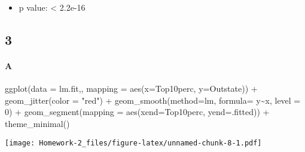\documentclass[
]{article}
\newenvironment{Shaded}{\begin{snugshade}}{\end{snugshade}}
\newcommand{\AttributeTok}[1]{\textcolor[rgb]{0.77,0.63,0.00}{#1}}
\newcommand{\DecValTok}[1]{\textcolor[rgb]{0.00,0.00,0.81}{#1}}
\newcommand{\FunctionTok}[1]{\textcolor[rgb]{0.00,0.00,0.00}{#1}}
\newcommand{\NormalTok}[1]{#1}
\newcommand{\SpecialCharTok}[1]{\textcolor[rgb]{0.00,0.00,0.00}{#1}}
\newcommand{\StringTok}[1]{\textcolor[rgb]{0.31,0.60,0.02}{#1}}
\providecommand{\tightlist}{%
  \setlength{\itemsep}{0pt}\setlength{\parskip}{0pt}}
\begin{document}
\begin{itemize}
\tightlist
\item
  p value: \textless{} 2.2e-16
\end{itemize}

\hypertarget{section-2}{%
\subsection{3}\label{section-2}}

\hypertarget{a-2}{%
\paragraph{A}\label{a-2}}

\begin{Shaded}
\begin{Highlighting}[]
\FunctionTok{ggplot}\NormalTok{(}\AttributeTok{data =}\NormalTok{ lm.fit,, }\AttributeTok{mapping =} \FunctionTok{aes}\NormalTok{(}\AttributeTok{x=}\NormalTok{Top10perc, }\AttributeTok{y=}\NormalTok{Outstate)) }\SpecialCharTok{+} \FunctionTok{geom\_jitter}\NormalTok{(}\AttributeTok{color =} \StringTok{"red"}\NormalTok{) }\SpecialCharTok{+} \FunctionTok{geom\_smooth}\NormalTok{(}\AttributeTok{method=}\StringTok{\textquotesingle{}lm\textquotesingle{}}\NormalTok{, }\AttributeTok{formula=}\NormalTok{ y}\SpecialCharTok{\textasciitilde{}}\NormalTok{x, }\AttributeTok{level =} \DecValTok{0}\NormalTok{) }\SpecialCharTok{+} \FunctionTok{geom\_segment}\NormalTok{(}\AttributeTok{mapping =} \FunctionTok{aes}\NormalTok{(}\AttributeTok{xend=}\NormalTok{Top10perc, }\AttributeTok{yend=}\NormalTok{.fitted)) }\SpecialCharTok{+} \FunctionTok{theme\_minimal}\NormalTok{()}
\end{Highlighting}
\end{Shaded}

\texttt{[image: Homework-2\_files/figure-latex/unnamed-chunk-8-1.pdf]}
\end{document}
